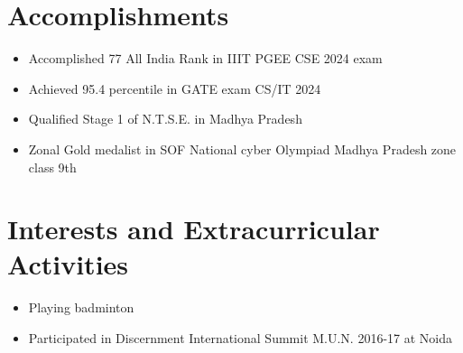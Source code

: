 \documentclass{article}
\begin{document}
\section*{Accomplishments}
\begin{itemize}
	\item Accomplished 77 All India Rank in IIIT PGEE CSE 2024 exam
	\item Achieved 95.4 percentile in GATE exam CS/IT 2024
	\item Qualified Stage 1 of N.T.S.E. in Madhya Pradesh
	\item Zonal Gold medalist in SOF National cyber Olympiad Madhya Pradesh zone class 9th
\end{itemize}

\section*{Interests and Extracurricular Activities}
\begin{itemize}
	\item Playing badminton
	\item Participated in Discernment International Summit M.U.N. 2016-17 at Noida
\end{itemize}
\end{document}

